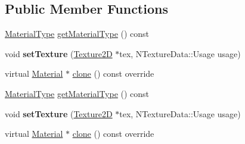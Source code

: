 \subsection*{Public Member Functions}
\begin{DoxyCompactItemize}
\item 
\hyperlink{classSprite3DMaterial_a2b3cb11be78a5f6332cc01d5b7063e32}{Material\+Type} \hyperlink{classSprite3DMaterial_a38ed69aaae1203a9161277f511d9b17c}{get\+Material\+Type} () const
\item 
\mbox{\label{classSprite3DMaterial_a3a36927889ceaacf09e0103d2bec9dde}} 
void {\bfseries set\+Texture} (\hyperlink{classTexture2D}{Texture2D} $\ast$tex, N\+Texture\+Data\+::\+Usage usage)
\item 
virtual \hyperlink{classMaterial}{Material} $\ast$ \hyperlink{classSprite3DMaterial_ac812fcb53172b407d4401d5242ce8d4e}{clone} () const override
\item 
\hyperlink{classSprite3DMaterial_a2b3cb11be78a5f6332cc01d5b7063e32}{Material\+Type} \hyperlink{classSprite3DMaterial_a38ed69aaae1203a9161277f511d9b17c}{get\+Material\+Type} () const
\item 
\mbox{\label{classSprite3DMaterial_a3a36927889ceaacf09e0103d2bec9dde}} 
void {\bfseries set\+Texture} (\hyperlink{classTexture2D}{Texture2D} $\ast$tex, N\+Texture\+Data\+::\+Usage usage)
\item 
virtual \hyperlink{classMaterial}{Material} $\ast$ \hyperlink{classSprite3DMaterial_a2ce762d8a3abe91eb5abe2df95aa63f4}{clone} () const override
\end{DoxyCompactItemize}
